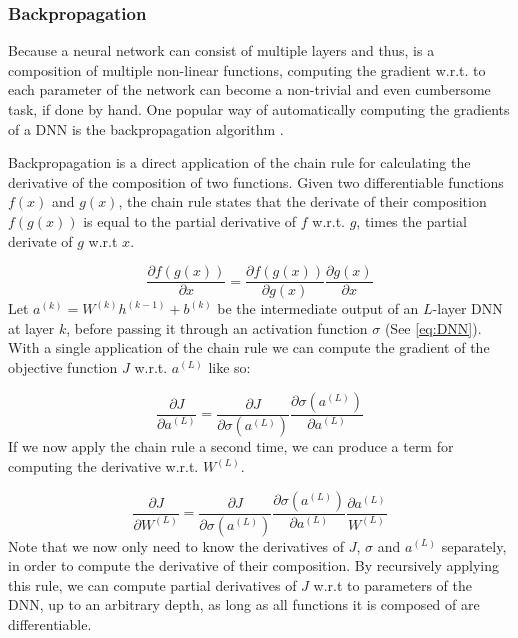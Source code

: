\subsubsection{Backpropagation}
\label{sec:backprop}
Because a neural network can consist of multiple layers and thus, is a composition of multiple non-linear functions, computing the gradient w.r.t. to each parameter of the network can become a non-trivial and even cumbersome task, if done by hand. One popular way of automatically computing the gradients of a DNN is the backpropagation algorithm \cite{rumelhart1988learning}.

Backpropagation is a direct application of the chain rule for calculating the derivative of the composition of two functions. Given two differentiable functions $f(x)$ and $g(x)$, the chain rule states that the derivate of their composition $f(g(x))$ is equal to the partial derivative of $f$ w.r.t. $g$, times the partial derivate of $g$ w.r.t $x$.

\begin{equation}
    \frac{\partial f(g(x))}{\partial x} = \frac{\partial f(g(x))}{\partial g(x)} \frac{\partial g(x)}{\partial x}
\end{equation}
Let $a^{(k)} = W^{(k)} h^{(k-1)} + b^{(k)}$ be the intermediate output of an $L$-layer DNN at layer $k$, before passing it through an activation function $\sigma$ (See \ref{eq:DNN}). With a single application of the chain rule we can compute the gradient of the objective function $J$ w.r.t. $a^{(L)}$ like so:

\begin{equation}
    \frac{\partial J}{\partial a^{(L)}} = \frac{\partial J}{\partial \sigma(a^{(L)})} \frac{\partial \sigma(a^{(L)})}{\partial a^{(L)}}
\end{equation}
If we now apply the chain rule a second time, we can produce a term for computing the derivative w.r.t. $W^{(L)}$.

\begin{equation}
    \frac{\partial J}{\partial W^{(L)}} = \frac{\partial J}{\partial \sigma(a^{(L)})} \frac{\partial \sigma(a^{(L)})}{\partial a^{(L)}} \frac{\partial a^{(L)}}{W^{(L)}}
\end{equation}
Note that we now only need to know the derivatives of $J$, $\sigma$ and $a^{(L)}$ separately, in order to compute the derivative of their composition. By recursively applying this rule, we can compute partial derivatives of $J$ w.r.t to parameters of the DNN, up to an arbitrary depth, as long as all functions it is composed of are differentiable.

